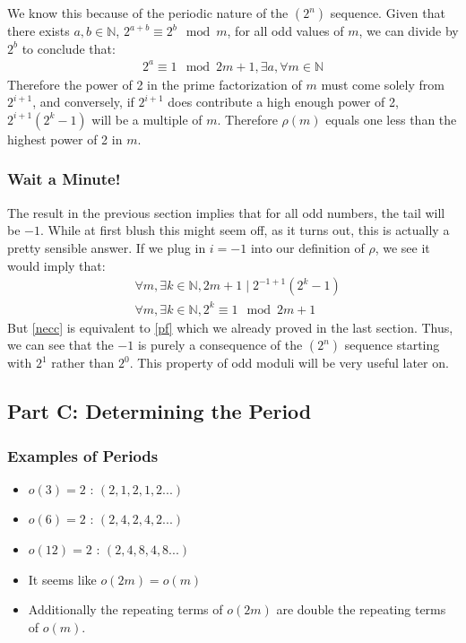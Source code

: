 \documentclass{article}
\begin{document}
  We know this because of the periodic nature of the $(2^n)$ sequence. Given that there exists $a, b \in \mathbb{N}$, $2^{a+b} \equiv 2^b \mod m$, for all odd values of $m$, we can divide by $2^b$ to conclude that:
  \begin{align}
    2^a \equiv 1 \mod 2m+1, \exists a, \forall m \in \mathbb{N} \label{pf}
  \end{align}
  Therefore the power of 2 in the prime factorization of $m$ must come solely from $2^{i+1}$, and conversely, if $2^{i+1}$ does contribute a high enough power of 2, $2^{i+1}(2^k-1)$ will be a multiple of $m$. Therefore $\rho(m)$ equals one less than the highest power of 2 in $m$.
  \subsubsection{Wait a Minute!}
  The result in the previous section implies that for all odd numbers, the tail will be $-1$. While at first blush this might seem off, as it turns out, this is actually a pretty sensible answer. If we plug in $i = -1$ into our definition of $\rho$, we see it would imply that:
  \begin{align}
    &\forall m, \exists k \in \mathbb{N}, 2m+1 \mid 2^{-1+1}(2^k - 1)\\
    &\forall m, \exists k \in \mathbb{N}, 2^k \equiv 1 \mod 2m+1 \label{necc}
  \end{align}
  But \eqref{necc} is equivalent to \eqref{pf} which we already proved in the last section. Thus, we can see that the $-1$ is purely a consequence of the $(2^n)$ sequence starting with $2^1$ rather than $2^0$. This property of odd moduli will be very useful later on.
  \subsection{Part C: Determining the Period}
  \subsubsection{Examples of Periods}
  \begin{itemize}
  \item $o(3) = 2$ : $(2, 1, 2, 1, 2 ...)$
  \item $o(6) = 2$ : $(2, 4, 2, 4, 2 ...)$
  \item $o(12)= 2$ : $(2, 4, 8, 4, 8 ...)$
  \item It seems like $o(2m) = o(m)$
  \item Additionally the repeating terms of $o(2m)$ are double the repeating terms of $o(m)$.
  \end{itemize}
\end{document}
